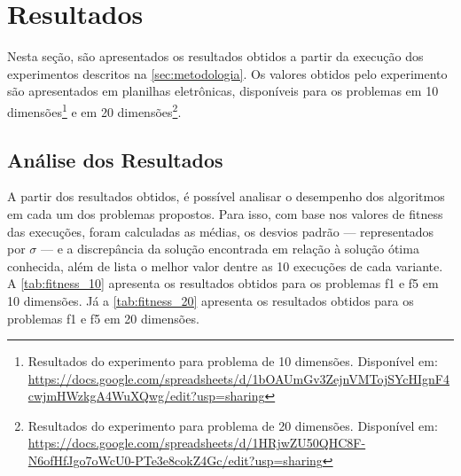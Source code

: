 \section{Resultados}%
\label{sec:resultados}

Nesta seção, são apresentados os resultados obtidos a partir da execução dos experimentos descritos na \autoref{sec:metodologia}.
Os valores obtidos pelo experimento são apresentados em planilhas eletrônicas, disponíveis para os problemas em 10 dimensões\footnote{Resultados do experimento para problema de 10 dimensões. Disponível em: \url{https://docs.google.com/spreadsheets/d/1bOAUmGv3ZejnVMTojSYcHIgnF4cwjmHWzkgA4WuXQwg/edit?usp=sharing}} e em 20 dimensões\footnote{Resultados do experimento para problema de 20 dimensões. Disponível em: \url{https://docs.google.com/spreadsheets/d/1HRjwZU50QHC8F-N6ofHfJgo7oWcU0-PTe3e8cokZ4Gc/edit?usp=sharing}}.

\subsection{Análise dos Resultados}%

A partir dos resultados obtidos, é possível analisar o desempenho dos algoritmos em cada um dos problemas propostos.
Para isso, com base nos valores de \gls{fitness} das execuções, foram calculadas as médias, os desvios padrão --- representados por \( \sigma \) --- e a discrepância da solução encontrada em relação à solução ótima conhecida, além de lista o melhor valor dentre as 10 execuções de cada variante.
A \autoref{tab:fitness_10} apresenta os resultados obtidos para os problemas \gls{f1} e \gls{f5} em 10 dimensões. Já a \autoref{tab:fitness_20} apresenta os resultados obtidos para os problemas \gls{f1} e \gls{f5} em 20 dimensões.


